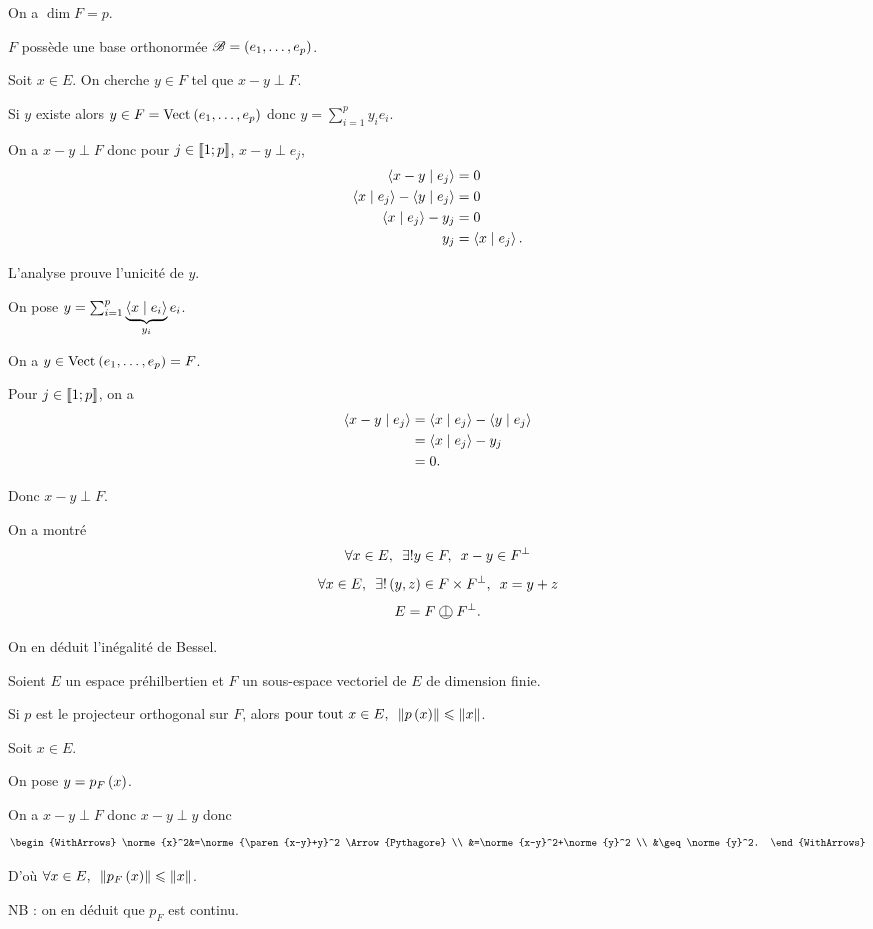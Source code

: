 \begin{dem}
On a \(\dim F=p\).

\(F\) possède une base orthonormée \(\mathscr{B}=\left(e_1,\dots,e_p\right)\).

Soit \(x\in E\). On cherche \(y\in F\) tel que \(x-y\perp F\).

\analyse

Si \(y\) existe alors \(y\in F=\Vect{e_1,\dots,e_p}\) donc \(y=\sum_{i=1}^py_ie_i\).

On a \(x-y\perp F\) donc pour \(j\in\left\llbracket1;p\right\rrbracket\), \(x-y\perp e_j\), \ie \[\begin{aligned}
\ps{x-y}{e_j}&=0 \\
\ps{x}{e_j}-\ps{y}{e_j}&=0 \\
\ps{x}{e_j}-y_j&=0 \\
y_j&=\ps{x}{e_j}.
\end{aligned}\]

L'analyse prouve l'unicité de \(y\).

\synthese

On pose \(y=\sum_{i=1}^p\underbrace{\ps{x}{e_i}}_{y_i}e_i\).

On a \(y\in\Vect{e_1,\dots,e_p}=F\).

Pour \(j\in\left\llbracket1;p\right\rrbracket\), on a \[\begin{aligned}
\ps{x-y}{e_j}&=\ps{x}{e_j}-\ps{y}{e_j} \\
&=\ps{x}{e_j}-y_j \\
&=0.
\end{aligned}\]

Donc \(x-y\perp F\).

\conclusion

On a montré \[\quantifs{\forall x\in E;\exists!y\in F}x-y\in F\ortho\] \ie \[\quantifs{\forall x\in E;\exists!\paren{y,z}\in F\times F\ortho}x=y+z\] \ie \[E=F\operp F\ortho.\]
\end{dem}

On en déduit l'inégalité de Bessel.

\begin{prop}
Soient \(E\) un espace préhilbertien et \(F\) un sous-espace vectoriel de \(E\) de dimension finie.

Si \(p\) est le projecteur orthogonal sur \(F\), alors \(\quantifs{\tpt x\in E}\norme{p\paren{x}}\leq\norme{x}\).
\end{prop}

\begin{dem}
Soit \(x\in E\).

On pose \(y=p_F\left(x\right)\).

On a \(x-y\perp F\) donc \(x-y\perp y\) donc \[\begin{WithArrows}
\norme{x}^2&=\norme{\paren{x-y}+y}^2 \Arrow{Pythagore} \\
&=\norme{x-y}^2+\norme{y}^2 \\
&\geq\norme{y}^2.
\end{WithArrows}\]

D'où \(\quantifs{\forall x\in E}\norme{p_F\paren{x}}\leq\norme{x}\).

NB : on en déduit que \(p_F\) est continu.
\end{dem}

